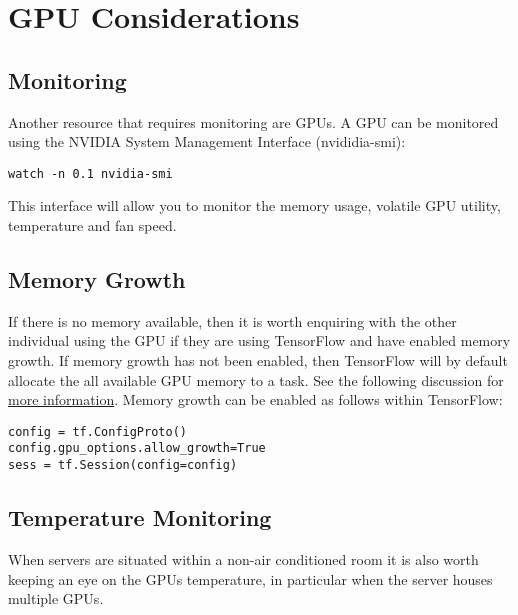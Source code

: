 \documentclass[
]{book}
\begin{document}
\hypertarget{gpu-considerations}{%
\section{GPU Considerations}\label{gpu-considerations}}

\hypertarget{monitoring}{%
\subsection{Monitoring}\label{monitoring}}

Another resource that requires monitoring are GPUs. A GPU can be monitored using the NVIDIA System Management Interface (nvididia-smi):

\begin{verbatim}
watch -n 0.1 nvidia-smi
\end{verbatim}

This interface will allow you to monitor the memory usage, volatile GPU utility, temperature and fan speed.

\hypertarget{memory-growth}{%
\subsection{Memory Growth}\label{memory-growth}}

If there is no memory available, then it is worth enquiring with the other individual using the GPU if they are using TensorFlow and have enabled memory growth. If memory growth has not been enabled, then TensorFlow will by default allocate the all available GPU memory to a task. See the following discussion for \href{https://stackoverflow.com/questions/34199233/how-to-prevent-tensorflow-from-allocating-the-totality-of-a-gpu-memory}{more information}. Memory growth can be enabled as follows within TensorFlow:

\begin{verbatim}
config = tf.ConfigProto()
config.gpu_options.allow_growth=True
sess = tf.Session(config=config)
\end{verbatim}

\hypertarget{temperature-monitoring}{%
\subsection{Temperature Monitoring}\label{temperature-monitoring}}

When servers are situated within a non-air conditioned room it is also worth keeping an eye on the GPUs temperature, in particular when the server houses multiple GPUs.

  
\end{document}
